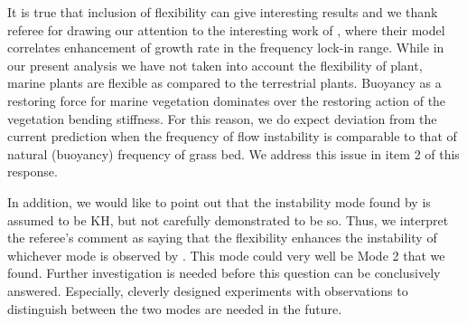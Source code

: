 \documentclass[letterpaper,10pt]{article}
\begin{document}
\begin{enumerate}
It is true that inclusion of flexibility can give interesting results and we thank referee for drawing our attention to the interesting work of \cite{Gosselin2009}, where their model correlates enhancement of growth rate in the frequency lock-in range. 
While in our present analysis we have not taken into account the flexibility of plant, marine plants are flexible as compared to the terrestrial plants.
Buoyancy as a restoring force for marine vegetation dominates over the restoring action of the vegetation bending stiffness.
For this reason, we do expect deviation from the current prediction when the frequency of flow instability is comparable to that of natural (buoyancy) frequency of grass bed.  
We address this issue in item 2 of this response.

In addition, we would like to point out that the instability mode found by \cite{Gosselin2009} is assumed to be KH, but not carefully demonstrated to be so.
Thus, we interpret the referee's comment as saying that the flexibility enhances the instability of whichever mode is observed by \cite{Gosselin2009}. 
This mode could very well be Mode 2 that we found. 
Further investigation is needed before this question can be conclusively answered.
Especially, cleverly designed experiments with observations to distinguish between the two modes are needed in the future.

\end{enumerate}
\end{document}
